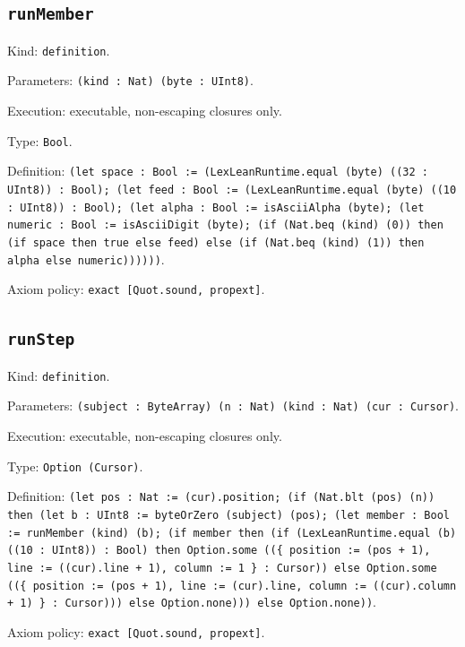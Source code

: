 \documentclass[11pt]{article}
\begin{document}
\subsection*{\texttt{runMember}}
\noindent Kind: \texttt{definition}.\par
\noindent Parameters: \texttt{(kind : Nat) (byte : UInt8)}.\par
\noindent Execution: executable, non-escaping closures only.\par
\noindent Type: \texttt{Bool}.\par
\noindent Definition: \texttt{(let space : Bool := (LexLeanRuntime.equal (byte) ((32 : UInt8)) : Bool); (let feed : Bool := (LexLeanRuntime.equal (byte) ((10 : UInt8)) : Bool); (let alpha : Bool := isAsciiAlpha (byte); (let numeric : Bool := isAsciiDigit (byte); (if (Nat.beq (kind) (0)) then (if space then true else feed) else (if (Nat.beq (kind) (1)) then alpha else numeric))))))}.\par
\noindent Axiom policy: \texttt{exact [Quot.sound, propext]}.\par
\subsection*{\texttt{runStep}}
\noindent Kind: \texttt{definition}.\par
\noindent Parameters: \texttt{(subject : ByteArray) (n : Nat) (kind : Nat) (cur : Cursor)}.\par
\noindent Execution: executable, non-escaping closures only.\par
\noindent Type: \texttt{Option (Cursor)}.\par
\noindent Definition: \texttt{(let pos : Nat := (cur).position; (if (Nat.blt (pos) (n)) then (let b : UInt8 := byteOrZero (subject) (pos); (let member : Bool := runMember (kind) (b); (if member then (if (LexLeanRuntime.equal (b) ((10 : UInt8)) : Bool) then Option.some ((\{ position := (pos + 1), line := ((cur).line + 1), column := 1 \} : Cursor)) else Option.some ((\{ position := (pos + 1), line := (cur).line, column := ((cur).column + 1) \} : Cursor))) else Option.none))) else Option.none))}.\par
\noindent Axiom policy: \texttt{exact [Quot.sound, propext]}.\par
\end{document}
